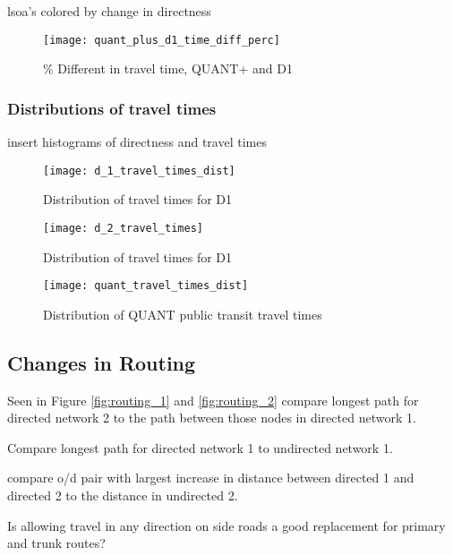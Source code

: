 lsoa's colored by change in directness 

\begin{figure}
\centering
\texttt{[image: quant\_plus\_d1\_time\_diff\_perc]}
\caption{\% Different in travel time, QUANT+ and D1}
\label{fig:quant_d1_time}
\end{figure}


\subsubsection{Distributions of travel times}

insert histograms of directness and travel times
\begin{figure}
\centering
\texttt{[image: d\_1\_travel\_times\_dist]}
\caption{Distribution of travel times for D1}
\label{fig:d1_distrib}
\end{figure}

\begin{figure}
\centering
\texttt{[image: d\_2\_travel\_times]}
\caption{Distribution of travel times for D1}
\label{fig:d2_distrib}
\end{figure}

\begin{figure}
\centering
\texttt{[image: quant\_travel\_times\_dist]}
\caption{Distribution of QUANT public transit travel times}
\label{fig:quant_distrib}
\end{figure}


\subsection{Changes in Routing}

Seen in Figure \ref{fig:routing_1} and \ref{fig:routing_2} compare longest path for directed network 2 to the path between those nodes in directed network 1. 

Compare longest path for directed network 1 to undirected network 1. 

compare o/d pair with largest increase in distance between directed 1 and directed 2 to the distance in undirected 2. 

Is allowing travel in any direction on side roads a good replacement for primary and trunk routes?


